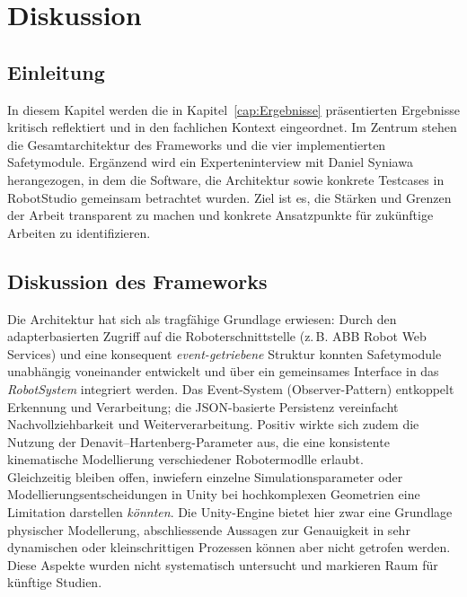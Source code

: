 \chapter{Diskussion}
\label{cap:diskussion}


\section{Einleitung} In diesem Kapitel werden die in
Kapitel~\ref{cap:Ergebnisse} präsentierten
Ergebnisse kritisch reflektiert und in den fachlichen Kontext eingeordnet. Im
Zentrum stehen die Gesamtarchitektur des Frameworks und die vier implementierten
Safetymodule. Ergänzend wird ein Experteninterview mit Daniel Syniawa
herangezogen, in dem die Software, die Architektur sowie konkrete Testcases in
RobotStudio gemeinsam betrachtet wurden. Ziel ist es, die Stärken und Grenzen
der Arbeit transparent zu machen und konkrete Ansatzpunkte für zukünftige
Arbeiten zu identifizieren.

\section{Diskussion des Frameworks}

Die Architektur hat sich als tragfähige Grundlage erwiesen: Durch den
adapterbasierten Zugriff auf die Roboterschnittstelle (z.\,B. ABB Robot Web
Services) und eine konsequent \emph{event-getriebene} Struktur konnten
Safetymodule unabhängig voneinander entwickelt und über ein gemeinsames
Interface in das \emph{RobotSystem} integriert werden. Das Event-System
(Observer-Pattern) entkoppelt Erkennung und Verarbeitung; die JSON-basierte
Persistenz vereinfacht Nachvollziehbarkeit und Weiterverarbeitung. Positiv
wirkte sich zudem die Nutzung der Denavit–Hartenberg-Parameter aus, die eine
konsistente kinematische Modellierung verschiedener Robotermodlle erlaubt.\\

\noindent Gleichzeitig bleiben offen, inwiefern einzelne Simulationsparameter
oder Modellierungsentscheidungen in Unity bei hochkomplexen Geometrien eine
Limitation darstellen \emph{könnten}. Die Unity-Engine bietet hier zwar eine
Grundlage physischer Modellerung, abschliessende Aussagen zur Genauigkeit in
sehr dynamischen oder kleinschrittigen Prozessen können aber nicht getrofen
werden. Diese Aspekte wurden nicht systematisch untersucht und markieren Raum
für künftige Studien.\\

